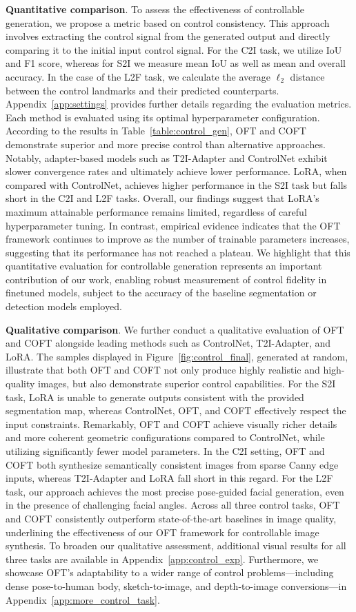 \textbf{Quantitative comparison}. To assess the effectiveness of controllable generation, we propose a metric based on control consistency. This approach involves extracting the control signal from the generated output and directly comparing it to the initial input control signal. For the C2I task, we utilize IoU and F1 score, whereas for S2I we measure mean IoU as well as mean and overall accuracy. In the case of the L2F task, we calculate the average $\ell_2$ distance between the control landmarks and their predicted counterparts. Appendix~\ref{app:settings} provides further details regarding the evaluation metrics. Each method is evaluated using its optimal hyperparameter configuration. According to the results in Table~\ref{table:control_gen}, OFT and COFT demonstrate superior and more precise control than alternative approaches. Notably, adapter-based models such as T2I-Adapter and ControlNet exhibit slower convergence rates and ultimately achieve lower performance. LoRA, when compared with ControlNet, achieves higher performance in the S2I task but falls short in the C2I and L2F tasks. Overall, our findings suggest that LoRA’s maximum attainable performance remains limited, regardless of careful hyperparameter tuning. In contrast, empirical evidence indicates that the OFT framework continues to improve as the number of trainable parameters increases, suggesting that its performance has not reached a plateau. We highlight that this quantitative evaluation for controllable generation represents an important contribution of our work, enabling robust measurement of control fidelity in finetuned models, subject to the accuracy of the baseline segmentation or detection models employed.

\textbf{Qualitative comparison}. We further conduct a qualitative evaluation of OFT and COFT alongside leading methods such as ControlNet, T2I-Adapter, and LoRA. The samples displayed in Figure~\ref{fig:control_final}, generated at random, illustrate that both OFT and COFT not only produce highly realistic and high-quality images, but also demonstrate superior control capabilities. For the S2I task, LoRA is unable to generate outputs consistent with the provided segmentation map, whereas ControlNet, OFT, and COFT effectively respect the input constraints. Remarkably, OFT and COFT achieve visually richer details and more coherent geometric configurations compared to ControlNet, while utilizing significantly fewer model parameters. In the C2I setting, OFT and COFT both synthesize semantically consistent images from sparse Canny edge inputs, whereas T2I-Adapter and LoRA fall short in this regard. For the L2F task, our approach achieves the most precise pose-guided facial generation, even in the presence of challenging facial angles. Across all three control tasks, OFT and COFT consistently outperform state-of-the-art baselines in image quality, underlining the effectiveness of our OFT framework for controllable image synthesis. To broaden our qualitative assessment, additional visual results for all three tasks are available in Appendix~\ref{app:control_exp}. Furthermore, we showcase OFT's adaptability to a wider range of control problems—including dense pose-to-human body, sketch-to-image, and depth-to-image conversions—in Appendix~\ref{app:more_control_task}.

